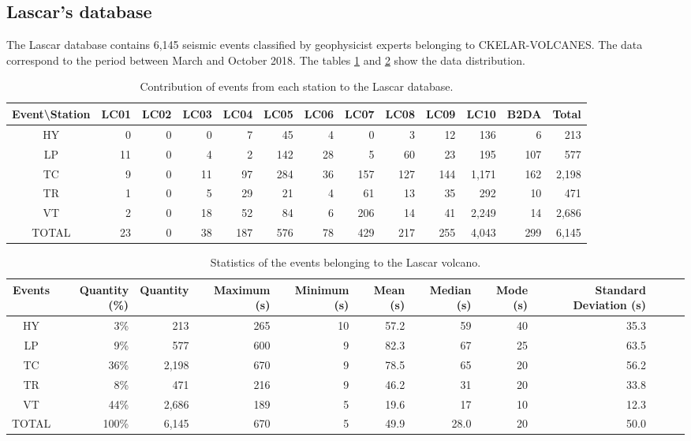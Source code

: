 \documentclass[lettersize,journal]{IEEEtran}
\begin{document}
\subsection{Lascar's database}
\noindent The Lascar database contains 6,145 seismic events classified by geophysicist experts belonging to CKELAR-VOLCANES. The data correspond to the period between March and October 2018. The tables \ref{table:lascar_database} and \ref{table:lascar_statistics} show the data distribution.
\begin{table}
\caption{Contribution of events from each station to the Lascar database.}
\centering
\begin{adjustbox}{width=\textwidth}
\begin{tabular}{crrrrrrrrrrrr}
\hline\hline
Event\textbackslash{}Station & LC01 & LC02 & LC03 & LC04 & LC05 & LC06 & LC07 & LC08 & LC09 & LC10 & B2DA & Total \\
\hline
HY & 0 & 0 & 0 & 7 & 45 & 4 & 0 & 3 & 12 & 136 & 6 & 213 \\
LP & 11 & 0 & 4 & 2 & 142 & 28 & 5 & 60 & 23 & 195 & 107 & 577 \\
TC & 9 & 0 & 11 & 97 & 284 & 36 & 157 & 127 & 144 & 1,171 & 162 & 2,198 \\
TR & 1 & 0 & 5 & 29 & 21 & 4 & 61 & 13 & 35 & 292 & 10 & 471 \\
VT & 2 & 0 & 18 & 52 & 84 & 6 & 206 & 14 & 41 & 2,249 & 14 & 2,686 \\
\hline
TOTAL & 23 & 0 & 38 & 187 & 576 & 78 & 429 & 217 & 255 & 4,043 & 299 & 6,145 \\
\hline
\end{tabular}
\end{adjustbox}
\label{table:lascar_database}
\end{table}

\begin{table}
\caption{Statistics of the events belonging to the Lascar volcano.}
\centering
\begin{tabular}{crrrrrrrrrrr}
\hline\hline
  Events & Quantity (\%) & Quantity & Maximum (s) & Minimum (s) & Mean (s) & Median (s) & Mode (s) & Standard Deviation (s)  \\
\hline
HY & 3\% & 213 & 265 & 10 & 57.2 & 59 & 40 & 35.3 \\
LP & 9\% & 577 & 600 & 9 & 82.3 & 67 & 25 & 63.5 \\
TC & 36\% & 2,198 & 670 & 9 & 78.5 & 65 & 20 & 56.2 \\
TR & 8\% & 471 & 216 & 9 & 46.2 & 31 & 20 & 33.8 \\
VT & 44\% & 2,686 & 189 & 5 & 19.6 & 17 & 10 & 12.3 \\
\hline
TOTAL & 100\% & 6,145 & 670 & 5 & 49.9 & 28.0 & 20 & 50.0 \\
\hline
\end{tabular}
\label{table:lascar_statistics}
\end{table}
\end{document}
